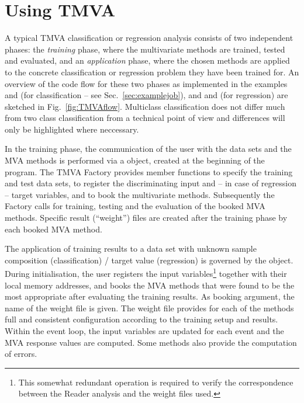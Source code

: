  \section{Using TMVA}
\label{sec:usingtmva}

A typical TMVA classification or regression analysis consists of two independent phases: 
the {\em training} phase, where the multivariate methods are trained, tested and 
evaluated, and an {\em application} phase, where the chosen methods are applied to 
the concrete classification or regression problem they have been trained for.
An overview of the code flow for these two phases as implemented in the 
examples  and 
(for classification -- see Sec.~\ref{sec:examplejob}), and 
 and 
 (for regression)
are sketched in Fig.~\ref{fig:TMVAflow}. Multiclass classification does not differ much from
two class classification from a technical point of view and differences will only be highlighted
where neccessary.
 
In the training phase, the communication of the user with the data sets and the 
MVA methods is performed via a  object, created at the beginning of 
the program. The TMVA Factory provides member functions to specify the training 
and test data sets, to register the discriminating input and -- in case of 
regression -- target variables, and to 
book the multivariate methods. Subsequently the Factory calls for 
training, testing and the evaluation of the booked MVA methods. Specific 
result (``weight'') files are created after the training phase by each booked 
MVA method.

The application of training results to a data set with unknown sample composition 
(classification) / target value (regression) is governed by the  object. 
During initialisation, the user registers the input variables\footnote
{
  This somewhat redundant operation is required to verify the correspondence between
  the Reader analysis and the weight files used.
} 
together with their local memory addresses, and books the MVA methods that were found 
to be the most appropriate after evaluating the training results. As booking argument, the 
name of the weight file is given. The weight file provides for each of the methods full 
and consistent configuration according to the training setup and results. Within the 
event loop, the input variables are updated for each event and the MVA response
values are computed. Some methods also provide the computation of errors. 

